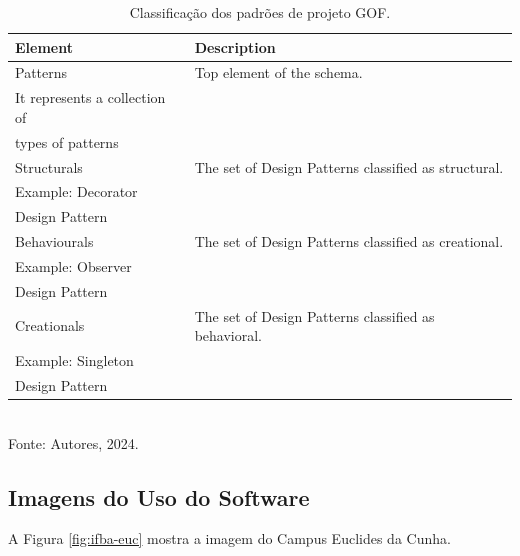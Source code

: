         \begin{table}[ht] 
        \caption{Classificação dos padrões de projeto GOF.}
        \label{tab:classification-of-gof-patterns}
        \begin{tabular*}{1\columnwidth}{@{\extracolsep{\fill}}>{\raggedright}p{}>{\raggedright}p{}}
        \toprule 
        \textbf{Element} & \textbf{Description}\tabularnewline
        \midrule
        \midrule 
        Patterns & Top element of the schema.\\It represents a collection of\\types of patterns\tabularnewline
        \midrule 
        Structurals & The set of Design Patterns classified as structural.\\Example: Decorator\\Design Pattern\tabularnewline
        \midrule 
        Behaviourals & The set of Design Patterns classified as creational.\\Example: Observer\\Design Pattern\tabularnewline
        \midrule 
        Creationals & The set of Design Patterns classified as behavioral.\\Example: Singleton\\Design Pattern\tabularnewline
        \midrule 
        \bottomrule
        \end{tabular*}
        \centering \\Fonte: Autores, 2024.
        \end{table}

            
    \clearpage
    
    \subsection{Imagens do Uso do Software} \textbf{ }

        A Figura \ref{fig:ifba-euc} mostra a imagem do Campus Euclides da Cunha.


